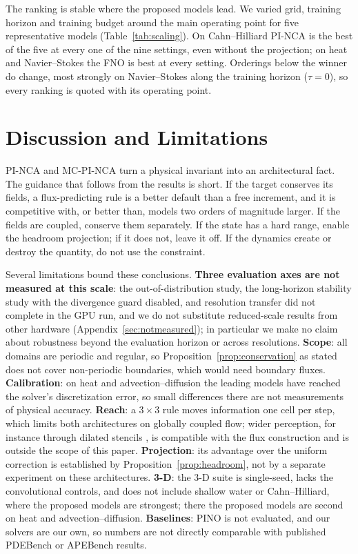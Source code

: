 \documentclass{article}
\begin{document}
The ranking is stable where the proposed models lead. We varied grid, training horizon and
training budget around the main operating point for five representative models
(Table~\ref{tab:scaling}). On Cahn--Hilliard PI-NCA is the best of the five at every one of
the nine settings, even without the projection; on heat and Navier--Stokes the FNO is best
at every setting. Orderings below the winner do change, most strongly on Navier--Stokes
along the training horizon ($\tau=0$), so every ranking is quoted with its operating point.

\section{Discussion and Limitations}
\label{sec:discussion}
\label{sec:limitations}
PI-NCA and MC-PI-NCA turn a physical invariant into an architectural fact. The guidance
that follows from the results is short. If the target conserves its fields, a
flux-predicting rule is a better default than a free increment, and it is competitive
with, or better than, models two orders of magnitude larger. If the fields are coupled,
conserve them separately. If the state has a hard range, enable the headroom projection;
if it does not, leave it off. If the dynamics create or destroy the quantity, do not use
the constraint.

Several limitations bound these conclusions. \textbf{Three evaluation axes are not
measured at this scale}: the out-of-distribution study, the long-horizon stability study
with the divergence guard disabled, and resolution transfer did not complete in the GPU
run, and we do not substitute reduced-scale results from other hardware
(Appendix~\ref{sec:notmeasured}); in particular we make no claim about robustness beyond
the evaluation horizon or across resolutions. \textbf{Scope}: all domains are periodic and
regular, so Proposition~\ref{prop:conservation} as stated does not cover non-periodic
boundaries, which would need boundary fluxes. \textbf{Calibration}: on heat and
advection--diffusion the leading models have reached the solver's discretization error, so
small differences there are not measurements of physical accuracy. \textbf{Reach}: a
$3\times3$ rule moves information one cell per step, which limits both architectures on
globally coupled flow; wider perception, for instance through dilated stencils
\citep{yu2016dilated}, is compatible with the flux construction and is outside the scope
of this paper. \textbf{Projection}: its advantage over the uniform correction is
established by Proposition~\ref{prop:headroom}, not by a separate experiment on these
architectures. \textbf{3-D}: the 3-D suite is single-seed, lacks the convolutional controls,
and does not include shallow water or Cahn--Hilliard, where the proposed models are
strongest; there the proposed models are second on heat and advection--diffusion.
\textbf{Baselines}: PINO is not evaluated, and our solvers are our own, so numbers are not
directly comparable with published PDEBench or APEBench results.
\end{document}

